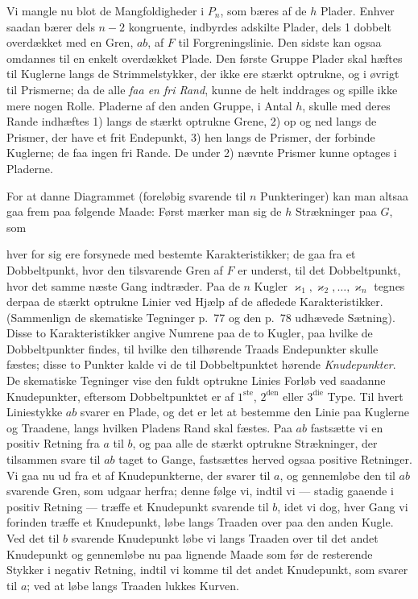 \documentclass{article}
\begin{document}
Vi mangle nu blot de Mangfoldigheder i $P_n$, som bæres af de $h$ Plader. Enhver saadan bærer dels $n - 2$ kongruente, indbyrdes adskilte Plader, dels 1 dobbelt overdækket med en Gren, $ab$, af $F$ til Forgreningslinie. Den sidste kan ogsaa omdannes til en enkelt overdækket Plade. Den første Gruppe Plader skal hæftes til Kuglerne langs de Strimmelstykker, der ikke ere stærkt optrukne, og i øvrigt til Prismerne; da de alle \emph{faa en fri Rand}, kunne de helt inddrages og spille ikke mere nogen Rolle. Pladerne af den anden Gruppe, i Antal $h$, skulle med deres Rande indhæftes 1) langs de stærkt optrukne Grene, 2) op og ned langs de Prismer, der have et frit Endepunkt, 3) hen langs de Prismer, der forbinde Kuglerne; de faa ingen fri Rande. De under 2) nævnte Prismer kunne optages i Pladerne.

For at danne Diagrammet (foreløbig svarende til $n$ Punkteringer) kan man altsaa gaa frem paa følgende Maade: Først mærker man sig de $h$ Strækninger paa $G$, som

hver for sig ere forsynede med bestemte Karakteristikker; de gaa fra et Dobbeltpunkt, hvor den tilsvarende Gren af $F$ er underst, til det Dobbeltpunkt, hvor det samme næste Gang indtræder. Paa de $n$ Kugler $\varkappa_1, \varkappa_2, \dots, \varkappa_n$ tegnes derpaa de stærkt optrukne Linier ved Hjælp af de afledede Karakteristikker. (Sammenlign de skematiske Tegninger p.\ 77 og den p.\ 78 udhævede Sætning). Disse to Karakteristikker angive Numrene paa de to Kugler, paa hvilke de Dobbeltpunkter findes, til hvilke den tilhørende Traads Endepunkter skulle fæstes; disse to Punkter kalde vi de til Dobbeltpunktet hørende \emph{Knudepunkter}. De skematiske Tegninger vise den fuldt optrukne Linies Forløb ved saadanne Knudepunkter, eftersom Dobbeltpunktet er af $1^{\text{ste}}$, $2^{\text{den}}$ eller $3^{\text{die}}$ Type. Til hvert Liniestykke $ab$ svarer en Plade, og det er let at bestemme den Linie paa Kuglerne og Traadene, langs hvilken Pladens Rand skal fæstes. Paa $ab$ fastsætte vi en positiv Retning fra $a$ til $b$, og paa alle de stærkt optrukne Strækninger, der tilsammen svare til $ab$ taget to Gange, fastsættes herved ogsaa positive Retninger. Vi gaa nu ud fra et af Knudepunkterne, der svarer til $a$, og gennemløbe den til $ab$ svarende Gren, som udgaar herfra; denne følge vi, indtil vi --- stadig gaaende i positiv Retning --- træffe et Knudepunkt svarende til $b$, idet vi dog, hver Gang vi forinden træffe et Knudepunkt, løbe langs Traaden over paa den anden Kugle. Ved det til $b$ svarende Knudepunkt løbe vi langs Traaden over til det andet Knudepunkt og gennemløbe nu paa lignende Maade som før de resterende Stykker i negativ Retning, indtil vi komme til det andet Knudepunkt, som svarer til $a$; ved at løbe langs Traaden lukkes Kurven.
\end{document}
